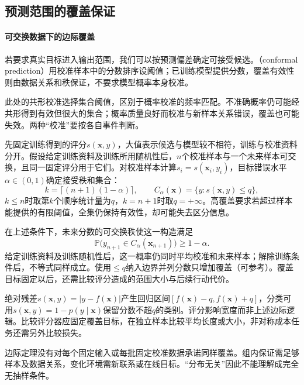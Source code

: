 \subsection{预测范围的覆盖保证}

\paragraph{可交换数据下的边际覆盖}

若要求真实目标进入输出范围，我们可以按预测偏差确定可接受候选。（conformal prediction）用校准样本中的分数排序设阈值；已训练模型提供分数，覆盖有效性则由数据关系和秩保证，不要求模型概率本身校准。

此处的共形校准选择集合阈值，区别于概率校准的频率匹配。不准确概率仍可能经共形得到有效但很大的集合；概率质量良好而校准与新样本关系错误，覆盖也可能失效。两种“校准”要按各自事件判断。

先固定训练得到的评分$s(\bm{x},y)$，大值表示候选与模型较不相符，训练与校准资料分开。假设给定训练资料及训练所用随机性后，$n$个校准样本与一个未来样本可交换，且同一固定评分用于它们。对校准样本计算$s_i=s(\bm{x}_i,y_i)$，目标错误水平$\alpha\in(0,1)$确定接受秩和集合：
\begin{equation}
 k=\lceil(n+1)(1-\alpha)\rceil,\qquad
 C_\alpha(\bm{x})=\{y:s(\bm{x},y)\leq q\},
 \label{eq:reliability-conformal-set}
\end{equation}
$k\leq n$时取第$k$个顺序统计量为$q$，$k=n+1$时取$q=+\infty$。高覆盖要求若超过样本能提供的有限阈值，全集仍保持有效性，却可能失去区分信息。

在上述条件下，未来分数的可交换秩使这一构造满足
\[
 \mathbb P\bigl(y_{n+1}\in C_\alpha(\bm{x}_{n+1})\bigr)
 \geq1-\alpha.
\]
给定训练资料及训练随机性后，这一概率仍同时平均校准和未来样本；解除训练条件后，不等式同样成立。使用$\leq q$纳入边界并列分数只增加覆盖（可参考）。覆盖目标固定以后，还需比较评分造成的范围大小与后续行动代价。

绝对残差$s(\bm{x},y)=|y-f(\bm{x})|$产生回归区间$[f(\bm{x})-q,f(\bm{x})+q]$，分类可用$s(\bm{x},y)=1-p(y\mid\bm{x})$保留分数不超$q$的类别。评分影响宽度而非上述边际逻辑。比较评分器应固定覆盖目标，在独立样本比较平均长度或大小，非对称成本任务还需另外比较损失。

边际定理没有对每个固定输入或每批固定校准数据承诺同样覆盖。组内保证需足够样本及数据关系，变化环境需新联系或在线目标。“分布无关”因此不能理解成完全无抽样条件。


